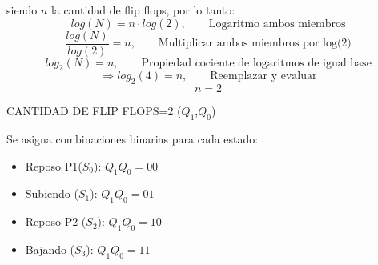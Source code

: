 siendo $n$ la cantidad de flip flops, por lo tanto: 
\[
	log(N) = n\cdot{}log(2),\qquad{}\text{Logaritmo ambos miembros}
\]
\[
	\frac{log(N)}{log(2)} = n,\qquad{}\text{Multiplicar ambos miembros por log(2)}
\]
\[
	log_2(N) = n,\qquad{}\text{Propiedad cociente de logaritmos de igual base}
\] 
\[
	\Rightarrow log_2(4) = n,\qquad{}\text{Reemplazar y evaluar}
\]
\[
	n = 2
\]
\begin{center}CANTIDAD DE FLIP FLOPS=2 ($Q_1$,$Q_0$) \end{center}
\sangria{} Se asigna combinaciones binarias para cada estado:
\begin{itemize}[nosep]
	\item Reposo P1($S_0$): $Q_1Q_0 = 00$
	\item Subiendo ($S_1$): $Q_1Q_0 = 01$
	\item Reposo P2 ($S_2$): $Q_1Q_0 = 10$
	\item Bajando ($S_3$): $Q_1Q_0 = 11$
\end{itemize}
